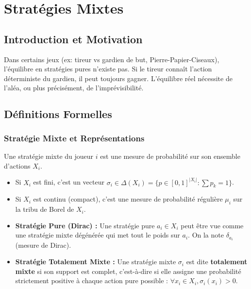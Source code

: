 \chapter{Stratégies Mixtes}

\section{Introduction et Motivation}
Dans certains jeux (ex: tireur vs gardien de but, Pierre-Papier-Ciseaux), l'équilibre en stratégies pures n'existe pas. Si le tireur connaît l'action déterministe du gardien, il peut toujours gagner. L'équilibre réel nécessite de l'aléa, ou plus précisément, de l'imprévisibilité.

\section{Définitions Formelles}

\subsection{Stratégie Mixte et Représentations}
\begin{definition}
Une stratégie mixte du joueur $i$ est une mesure de probabilité sur son ensemble d'actions $X_i$.
\begin{itemize}
    \item Si $X_i$ est fini, c'est un vecteur $\sigma_i \in \Delta(X_i) = \{ p \in [0,1]^{|X_i|} : \sum p_k = 1 \}$.
    \item Si $X_i$ est continu (compact), c'est une mesure de probabilité régulière $\mu_i$ sur la tribu de Borel de $X_i$.
\end{itemize}
\end{definition}

\begin{definition}
\begin{itemize}
    \item \textbf{Stratégie Pure (Dirac) :} Une stratégie pure $a_i \in X_i$ peut être vue comme une stratégie mixte dégénérée qui met tout le poids sur $a_i$. On la note $\delta_{a_i}$ (mesure de Dirac).
    \item \textbf{Stratégie Totalement Mixte :} Une stratégie mixte $\sigma_i$ est dite \textbf{totalement mixte} si son support est complet, c'est-à-dire si elle assigne une probabilité strictement positive à chaque action pure possible : $\forall x_i \in X_i, \sigma_i(x_i) > 0$.
\end{itemize}
\end{definition}

